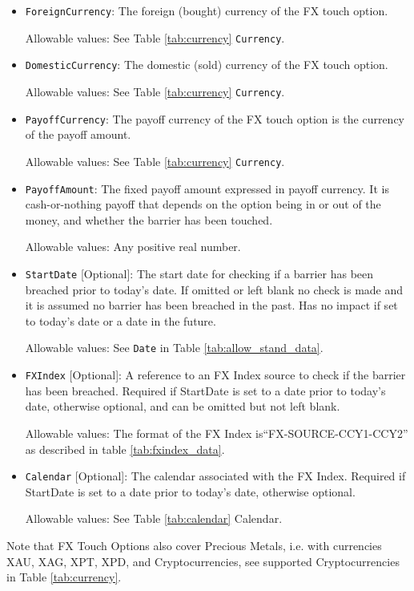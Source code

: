 \begin{itemize}
\item \lstinline!ForeignCurrency!: The foreign (bought) currency of the FX touch option.  

Allowable values:  See Table \ref{tab:currency} \lstinline!Currency!.

\item \lstinline!DomesticCurrency!: The domestic (sold) currency of the FX touch option.

Allowable values:  See Table \ref{tab:currency} \lstinline!Currency!.

\item \lstinline!PayoffCurrency!: The payoff currency of the FX touch option is the currency of the payoff amount. 

Allowable values:  See Table \ref{tab:currency} \lstinline!Currency!.

\item \lstinline!PayoffAmount!: The fixed payoff amount expressed in payoff currency. It is cash-or-nothing payoff that depends on the option being in or out of the money, and whether the barrier has been touched.

Allowable values:  Any positive real number.

\item \lstinline!StartDate! [Optional]: The start date for checking if a barrier has been breached prior to today's date.  If omitted or left blank no check is made and it is assumed no barrier has been breached in the past. Has no impact if set to today's date or a date in the future.

Allowable values:  See \lstinline!Date! in Table \ref{tab:allow_stand_data}.

\item \lstinline!FXIndex! [Optional]: A reference to an FX Index source to check if the barrier has been breached. Required if StartDate is set to a date prior to today's date, otherwise optional, and can be omitted but not left blank.

Allowable values: The format of the FX Index is``FX-SOURCE-CCY1-CCY2'' as described in table \ref{tab:fxindex_data}.  

\item \lstinline!Calendar! [Optional]: The calendar associated with the FX Index. Required if StartDate is set to a date prior to today's date, otherwise optional.

Allowable values: See Table \ref{tab:calendar} Calendar.
\end{itemize}

Note that FX Touch Options also cover Precious Metals, i.e. with
currencies XAU, XAG, XPT, XPD, and Cryptocurrencies,  see supported Cryptocurrencies in Table \ref{tab:currency}.